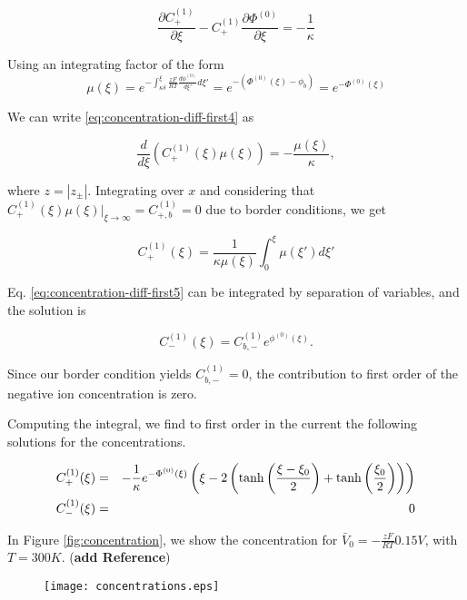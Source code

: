 $$\frac{\partial C^{(1)}_+}{\partial \xi}-C^{(1)}_+\frac{\partial \Phi^{(0)}}{\partial \xi} = -\frac{1}{\kappa}$$

Using an integrating factor of the form
$$\mu(\xi)=e^{-\int_{\kappa\delta}^\xi \frac{zF}{RT}\frac{d\phi^{(0)}}{d\xi'}d\xi'}=e^{- (\Phi^{(0)}(\xi)-\phi_b)} = e^{-\Phi^{(0)}(\xi)}$$

We can write \ref{eq:concentration-diff-first4}  as

$$\frac{d}{d\xi}\left(C^{(1)}_+(\xi)\mu(\xi) \right)=-\frac{\mu(\xi)}{\kappa},$$

where $z=|z_\pm|$. Integrating over $x$ and considering that $C^{(1)}_+(\xi)\mu(\xi)\big|_{\xi \rightarrow \infty} = C^{(1)}_{+,b} = 0$ due to border conditions, we get

$$C^{(1)}_+(\xi) =\frac{1}{\kappa\mu(\xi)}\int_{0}^{\xi}\mu(\xi')d\xi'$$

Eq. \ref{eq:concentration-diff-first5} can be integrated by separation of variables, and the solution is 

$$C^{(1)}_-(\xi) = C^{(1)}_{b,-}e^{\phi^{(0)}(\xi)}.$$

Since our border condition yields $ C^{(1)}_{b,-} = 0$, the contribution to first order of the negative ion concentration is zero. 

Computing the integral, we find to first order in the current the following solutions for the concentrations.

\begin{eqnarray}
C^{(1)}_+(\xi) &=& -\frac{1}{\kappa} e^{-\Phi^{(0)}(\xi)}\left(\xi-2\left({\tanh\left({\frac{\xi-\xi_0}{2}}\right) + \tanh\left({\frac{\xi_0}{2}}\right)}\right)\right)\nonumber\\ 
C^{(1)}_-(\xi) &=& 0
\label{eq:firstordersol}
\end{eqnarray}

In Figure \ref{fig:concentration}, we show the concentration for $\bar{V}_0=-\frac{zF}{RT}0.15 V$, with $T = 300 K $. (\textbf{add Reference})

\begin{figure*}[t!]
    \centering
    \begin{subfigure}[t]{0.75\textwidth}
        \centering
        \texttt{[image: concentrations.eps]}
    \end{subfigure}%
	\caption{ (b) Comparison of the equilibrium concentration and the concentration modified by the reaction with the interface}
\label{fig:concentration}	
\end{figure*}


